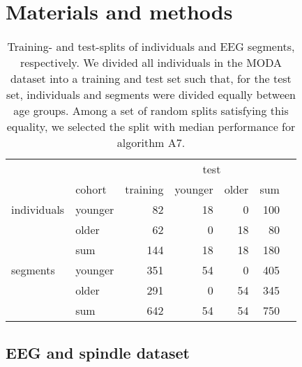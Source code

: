 \documentclass[fleqn,twocolumn,10pt]{wlscirep}
\begin{document}
\section{Materials and methods}
\label{sec:methods}

\begin{table}
	\centering
	
	\begin{tabular}{@{}llrrrrr@{}}
	\toprule
	& & & \multicolumn{2}{c}{test} & \\
	\cmidrule(l){4-5}
	& cohort & training & younger & older & sum \\
	\midrule
	individuals & younger & 82 & 18 & 0 & 100 \\
	& older & 62 & 0 & 18 & 80 \\
	& sum & 144 & 18 & 18 & 180 \\
	\midrule
	segments & younger & 351 & 54 & 0 & 405 \\
	& older & 291 & 0 & 54 & 345 \\
	& sum & 642 & 54 & 54 & 750 \\
	\bottomrule
	\end{tabular}
	\caption{
	Training- and test-splits of individuals and EEG segments, respectively.
We divided all individuals in the MODA dataset into a training and test set
	such that, for the test set, individuals and segments were divided equally between age groups.
	Among a set of random splits satisfying this equality, we selected the split with
	median performance for algorithm A7.
\label{tab:data:splits}
	}
\end{table}
	
\subsection{EEG and spindle dataset}
\end{document}
